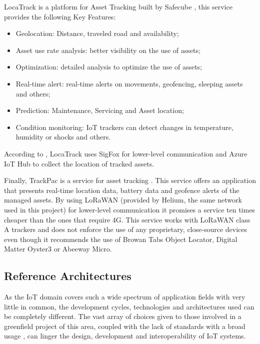 LocaTrack is a platform for Asset Tracking built by Safecube \parencite{safecube}, this service provides the following Key Features: 

\begin{itemize}
    \item Geolocation: Distance, traveled road and availability;
    \item Asset use rate analysis: better visibility on the use of assets;
    \item Optimization: detailed analysis to optimize the use of assets;
    \item Real-time alert: real-time alerts on movements, geofencing, sleeping assets and others;
    \item Prediction: Maintenance, Servicing and Asset location;
    \item Condition monitoring: IoT trackers can detect changes in temperature, humidity or shocks and others.
\end{itemize}

According to \cite{safecube-azure}, LocaTrack uses SigFox for lower-level communication and Azure IoT Hub to collect the location of tracked assets.

Finally, TrackPac is a service for asset tracking \parencite{trackpac}. This service offers an application that presents real-time location data, battery data and geofence alerts of the managed assets. By using LoRaWAN (provided by Helium, the same network used in this project) for lower-level communication it promises a service ten times cheaper than the ones that require 4G. This service works with LoRaWAN class A trackers and does not enforce the use of any proprietary, close-source devices even though it recommends the use of Browan Tabs Object Locator, Digital Matter Oyster3 or Abeeway Micro. 

\subsection{Reference Architectures}
\label{subsec:stateofart:arch:ref}

As the \gls{IoT} domain covers such a wide spectrum of application fields with very little in common, the development cycles, technologies and architectures used can be completely different. The vast array of choices given to those involved in a greenfield project of this area, coupled with the lack of standards with a broad usage \parencite{DIAS2022100529, weyrich2015reference}, can linger the design, development and interoperability of \gls{IoT} systems.

